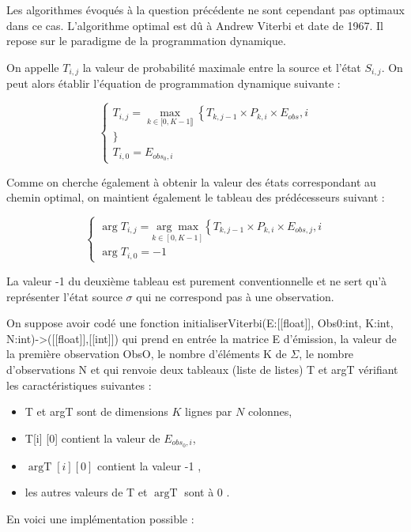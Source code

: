 \documentclass[10pt]{article}
\begin{document}
Les algorithmes évoqués à la question précédente ne sont cependant pas optimaux dans ce cas. L'algorithme optimal est dû à Andrew Viterbi et date de 1967. Il repose sur le paradigme de la programmation dynamique.

On appelle $T_{i, j}$ la valeur de probabilité maximale entre la source et l'état $S_{i, j}$. On peut alors établir l'équation de programmation dynamique suivante :

$$
\left\{\begin{array}{l}
T_{i, j}=\max _{k \in[0, K-1 \rrbracket}\left\{T_{k, j-1} \times P_{k, i} \times E_{o b s}, i\right. \\
\} \\
T_{i, 0}=E_{o b s_{0}, i}
\end{array}\right.
$$

Comme on cherche également à obtenir la valeur des états correspondant au chemin optimal, on maintient également le tableau des prédécesseurs suivant :

$$
\left\{\begin{array}{l}
\arg T_{i, j}=\underset{k \in[0, K-1]}{\arg \max }\left\{T_{k, j-1} \times P_{k, i} \times E_{o b s, j}, i\right. \\
\arg T_{i, 0}=-1
\end{array}\right.
$$

La valeur -1 du deuxième tableau est purement conventionnelle et ne sert qu'à représenter l'état source $\sigma$ qui ne correspond pas à une observation.

On suppose avoir codé une fonction initialiserViterbi(E:[[float]], Obs0:int, K:int, N:int)->([[float]],[[int]]) qui prend en entrée la matrice E d'émission, la valeur de la première observation ObsO, le nombre d'éléments K de $\Sigma$, le nombre d'observations N et qui renvoie deux tableaux (liste de listes) T et argT vérifiant les caractéristiques suivantes :

\begin{itemize}
  \item T et argT sont de dimensions $K$ lignes par $N$ colonnes,
  \item T[i] [0] contient la valeur de $E_{o b s_{0}, i}$,
  \item $\operatorname{argT}[i][0]$ contient la valeur -1 ,
  \item les autres valeurs de T et $\operatorname{argT}$ sont à 0 .
\end{itemize}

En voici une implémentation possible :
\end{document}
